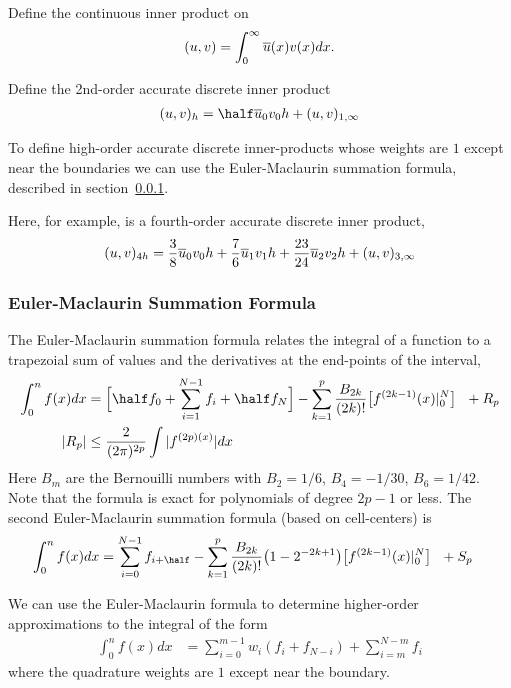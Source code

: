 Define the continuous inner product on 
\begin{align}
  (u,v ) = \int_0^\infty \overline{u}(x) v(x) d x .
\end{align}

Define the 2nd-order accurate discrete inner product
\begin{align}
  (u,v)_h  =   \half\ubar_0 v_0 h + (u,v)_{1,\infty}
\end{align}

To define high-order accurate discrete inner-products whose weights are
$1$ except near the boundaries we can use the Euler-Maclaurin summation formula, described in section~\ref{sec:EulerMaclaurin}. 

Here, for example, is a fourth-order accurate discrete inner product,
\begin{align}
  (u,v)_{4h}  =   {3\over 8}\overline{u}_0 v_0 h + {7\over6} \overline{u}_1 v_1 h + {23\over 24}\overline{u}_2 v_2 h + (u,v)_{3,\infty}
\end{align}


\subsubsection{Euler-Maclaurin Summation Formula}\label{sec:EulerMaclaurin}

The Euler-Maclaurin summation formula relates the integral of a function to a trapezoial sum of values and
the derivatives at the end-points of the interval, 
\begin{align}
  \int_0^n f(x) dx &= \Big[ \half f_0 + \sum_{i=1}^{N-1} f_i + \half f_N \Big]
           - \sum_{k=1}^p {B_{2k} \over (2k)!} \big[ f^{(2k-1)}(x)\vert_0^N \big] ~~ + R_p \\
   \vert R_p \vert &\le {2\over (2\pi)^{2p}} \int \vert f^{(2p)(x)} \vert dx 
\end{align}    
Here $B_m$ are the Bernouilli numbers with $B_2=1/6$, $B_4=-1/30$, $B_6=1/42$. 
Note that the formula is exact for polynomials of degree $2p-1$ or less.
The second Euler-Maclaurin summation formula (based on cell-centers) is
\begin{align}
  \int_0^n f(x) dx &= \sum_{i=0}^{N-1} f_{i+\half}
           - \sum_{k=1}^p {B_{2k} \over (2k)!}\big(1-2^{-2k+1}\big)\big[ f^{(2k-1)}(x)\vert_0^N \big] ~~ + S_p 
\end{align} 



We can use the Euler-Maclaurin formula to determine higher-order approximations to the integral
of the form
\begin{align}
  \int_0^n f(x) dx &= \sum_{i=0}^{m-1} w_i (f_i + f_{N-i})  + \sum_{i=m}^{N-m} f_i 
\end{align}  
where the quadrature weights are $1$ except near the boundary.


